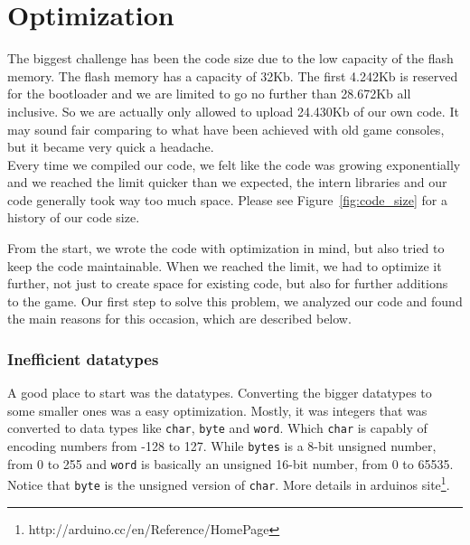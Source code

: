 \section{Optimization}%
The biggest challenge has been the code size due to the low capacity of the flash memory.  The flash memory has a capacity of 32Kb. The first 4.242Kb is reserved for the bootloader and we are limited to go no further than 28.672Kb all inclusive. So we are actually only allowed to upload 24.430Kb of our own code. It may sound fair comparing to what have been achieved with old game consoles, but it became very quick a headache.\\
Every time we compiled our code, we felt like the code was growing exponentially and we reached the limit quicker than we expected, the intern libraries and our code generally took way too much space. Please see Figure~\ref{fig:code_size} for a history of our code size.

From the start, we wrote the code with optimization in mind, but also tried to keep the code maintainable. When we reached the limit, we had to optimize it further, not just to create space for existing code, but also for further additions to the game. Our first step to solve this problem, we analyzed our code and found the main reasons for this occasion, which are described below.


\subsubsection{Inefficient datatypes}
A good place to start was the datatypes. Converting the bigger datatypes
to some smaller ones was a easy optimization. Mostly, it was integers that
was converted to data types like {\tt char}, {\tt byte} and {\tt word}.
Which {\tt char} is capably of encoding numbers from -128 to 127. While
{\tt bytes} is a 8-bit unsigned number, from 0 to 255 and {\tt word} is
basically an unsigned 16-bit number, from 0 to 65535. Notice that {\tt byte}
is the unsigned version of {\tt char}. More details in arduinos site\footnote{http://arduino.cc/en/Reference/HomePage}.

